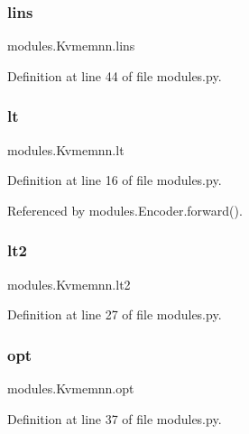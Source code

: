 \subsubsection{\texorpdfstring{lins}{lins}}
{\footnotesize\ttfamily modules.\+Kvmemnn.\+lins}



Definition at line 44 of file modules.\+py.

\mbox{\label{classmodules_1_1Kvmemnn_aa4c97cdfa243072fcc5f466187911bbf}} 
\subsubsection{\texorpdfstring{lt}{lt}}
{\footnotesize\ttfamily modules.\+Kvmemnn.\+lt}



Definition at line 16 of file modules.\+py.



Referenced by modules.\+Encoder.\+forward().

\mbox{\label{classmodules_1_1Kvmemnn_a61ec6a6dbebbdfd42ca0d2515b9b5009}} 
\subsubsection{\texorpdfstring{lt2}{lt2}}
{\footnotesize\ttfamily modules.\+Kvmemnn.\+lt2}



Definition at line 27 of file modules.\+py.

\mbox{\label{classmodules_1_1Kvmemnn_a2877519275db7685b91aa9eb52fc2215}} 
\subsubsection{\texorpdfstring{opt}{opt}}
{\footnotesize\ttfamily modules.\+Kvmemnn.\+opt}



Definition at line 37 of file modules.\+py.



